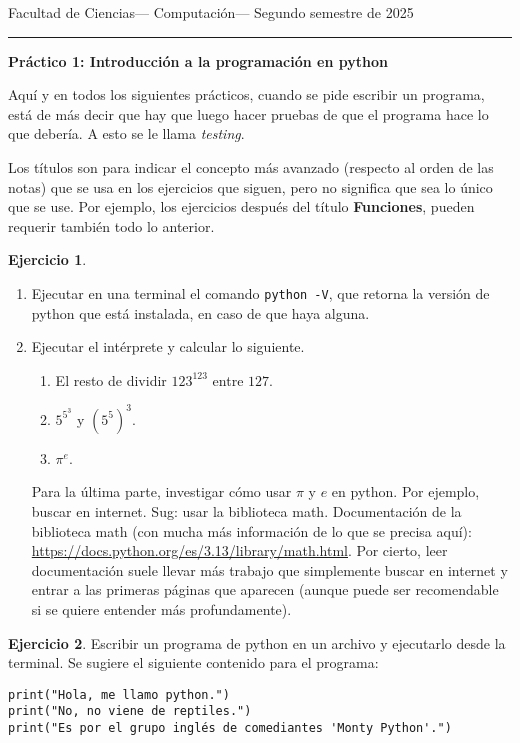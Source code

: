 \documentclass[a4paper,12pt]{book}
\theoremstyle{definition}
\newtheorem{ejercicio}{Ejercicio}
\begin{document}
	
	\noindent
	\centerline{\sc
		Facultad de Ciencias\hfill---\hfill
		Computación\hfill---\hfill
		Segundo semestre de 2025}\smallbreak\hrule
	
	\bigbreak
	\centerline{\Large\textbf{Práctico 1: Introducción a la programación en python}}
	\bigbreak
	
	Aquí y en todos los siguientes prácticos, cuando se pide escribir un programa, está de más decir que hay que luego hacer pruebas de que el programa hace lo que debería. A esto se le llama {\sl testing}.
	
	Los títulos son para indicar el concepto más avanzado (respecto al orden de las notas) que se usa en los ejercicios que siguen, pero no significa que sea lo único que se use. Por ejemplo, los ejercicios después del título {\bf Funciones}, pueden requerir también todo lo anterior.
	
	\begin{ejercicio}
		\begin{enumerate}
			\item Ejecutar en una terminal el comando {\tt python -V}, que retorna la versión de python que está instalada, en caso de que haya alguna.
			\item Ejecutar el intérprete y calcular lo siguiente.
			\begin{enumerate}\parskip-.5ex
				\item El resto de dividir $123^{123}$ entre $127$.
				\item $5^{5^3}$ y $(5^5)^3$.
				\item $\pi^e$.
			\end{enumerate}
			Para la última parte, investigar cómo usar $\pi$ y $e$ en python. Por ejemplo, buscar en internet. Sug: usar la biblioteca math. Documentación de la biblioteca math (con mucha más información de lo que se precisa aquí): \href{https://docs.python.org/es/3.13/library/math.html}{https://docs.python.org/es/3.13/library/math.html}. Por cierto, leer documentación suele llevar más trabajo que simplemente buscar en internet y entrar a las primeras páginas que aparecen (aunque puede ser recomendable si se quiere entender más profundamente).
		\end{enumerate}
		
		
	\end{ejercicio}
	\begin{ejercicio}
		Escribir un programa de python en un archivo y ejecutarlo desde la terminal. Se sugiere el siguiente contenido para el programa:
		\begin{verbatim}
print("Hola, me llamo python.")
print("No, no viene de reptiles.")
print("Es por el grupo inglés de comediantes 'Monty Python'.")
		\end{verbatim}
	\end{ejercicio}
	
\end{document}
